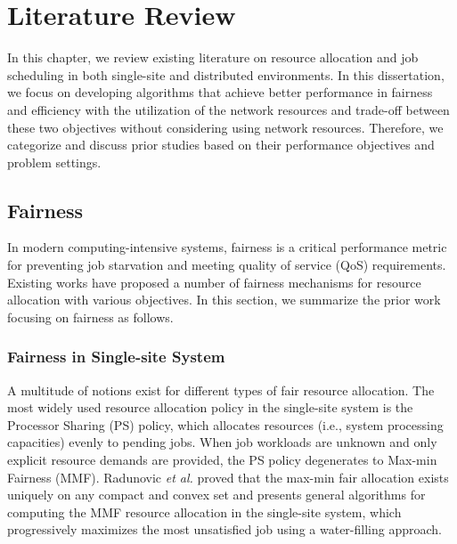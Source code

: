 
\chapter{Literature Review} %
\label{ch:literature_review}
In this chapter, we review existing literature on resource allocation and job scheduling in both single-site and distributed environments. In this dissertation, we focus on developing algorithms that achieve better performance in fairness and efficiency with the utilization of the network resources and trade-off between these two objectives without considering using network resources. Therefore, we categorize and discuss prior studies based on their performance objectives and problem settings.



\section{Fairness}
In modern computing-intensive systems, fairness is a critical performance metric for preventing job starvation and meeting quality of service (QoS) requirements. Existing works have proposed a number of fairness mechanisms for resource allocation with various objectives. In this section, we summarize the prior work focusing on fairness as follows.%

\subsection{Fairness in Single-site System}
A multitude of notions exist for different types of fair resource allocation. The most widely used resource allocation policy in the single-site system is the Processor Sharing (PS) policy, which allocates resources (i.e., system processing capacities) evenly to pending jobs. When job workloads are unknown and only explicit resource demands are provided, the PS policy degenerates to Max-min Fairness (MMF). Radunovic \textit{et al.} \cite{radunovic2007unified} proved that the max-min fair allocation exists uniquely on any compact and convex set and presents general algorithms for computing the MMF resource allocation in the single-site system, which progressively maximizes the most unsatisfied job using a water-filling approach. 

